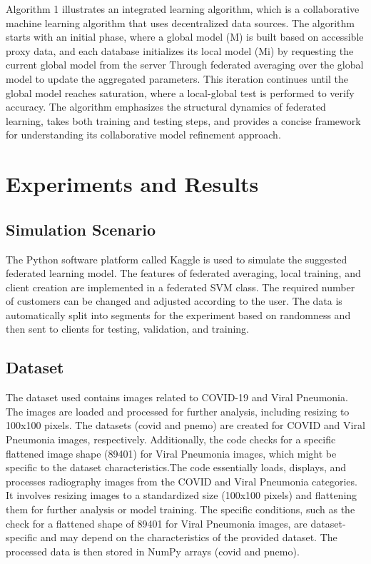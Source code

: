 \documentclass[conference]{IEEEtran}
\begin{document}
Algorithm 1 illustrates an integrated learning algorithm, which is a collaborative machine learning algorithm that uses decentralized data sources. The algorithm starts with an initial phase, where a global model (M) is built based on accessible proxy data, and each database initializes its local model (Mi) by requesting the current global model from the server Through federated averaging over the global model to update the aggregated parameters. This iteration continues until the global model reaches saturation, where a local-global test is performed to verify accuracy. The algorithm emphasizes the structural dynamics of federated learning, takes both training and testing steps, and provides a concise framework for understanding its collaborative model refinement approach.

\section{Experiments and Results}

\subsection{Simulation Scenario}
The Python software platform called Kaggle is used to simulate the suggested federated learning model. The features of federated averaging, local training, and client creation are implemented in a federated SVM class. The required number of customers can be changed and adjusted according to the user. The data is automatically split into segments for the experiment based on randomness and then sent to clients for testing, validation, and training.

\subsection{Dataset}

The dataset used contains images related to COVID-19 and Viral Pneumonia. The images are loaded and processed for further analysis, including resizing to 100x100 pixels. The datasets (covid and pnemo) are created for COVID and Viral Pneumonia images, respectively. Additionally, the code checks for a specific flattened image shape (89401) for Viral Pneumonia images, which might be specific to the dataset characteristics.The code essentially loads, displays, and processes radiography images from the COVID and Viral Pneumonia categories. It involves resizing images to a standardized size (100x100 pixels) and flattening them for further analysis or model training. The specific conditions, such as the check for a flattened shape of 89401 for Viral Pneumonia images, are dataset-specific and may depend on the characteristics of the provided dataset. The processed data is then stored in NumPy arrays (covid and pnemo).
\end{document}
